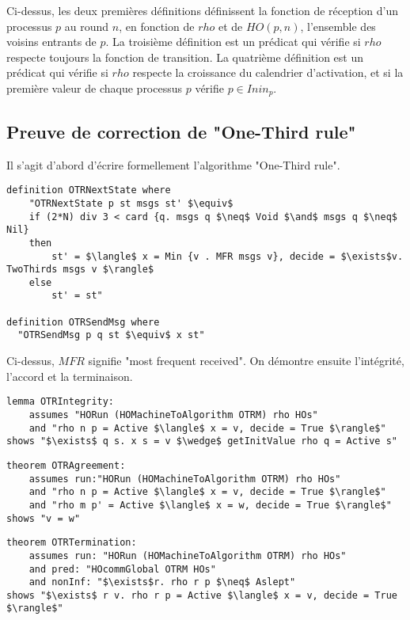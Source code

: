 \documentclass{article}
\begin{document}
Ci-dessus, les deux premières définitions définissent la fonction de réception d'un processus $p$ au round $n$, en fonction de $rho$ et de $HO(p, n)$, l'ensemble des voisins entrants de $p$.
La troisième définition est un prédicat qui vérifie si $rho$ respecte toujours la fonction de transition.
La quatrième définition est un prédicat qui vérifie si $rho$ respecte la croissance du calendrier d'activation, et si la première valeur de chaque processus $p$ vérifie $p \in Inin_p$.

\subsection{Preuve de correction de "One-Third rule"}

Il s'agit d'abord d'écrire formellement l'algorithme "One-Third rule".

\begin{lstlisting}[mathescape=true]
definition OTRNextState where
	"OTRNextState p st msgs st' $\equiv$ 
	if (2*N) div 3 < card {q. msgs q $\neq$ Void $\and$ msgs q $\neq$ Nil}
	then
		st' = $\langle$ x = Min {v . MFR msgs v}, decide = $\exists$v. TwoThirds msgs v $\rangle$
	else
		st' = st"

definition OTRSendMsg where
  "OTRSendMsg p q st $\equiv$ x st"
\end{lstlisting}

Ci-dessus, $MFR$ signifie "most frequent received".
On démontre ensuite l'intégrité, l'accord et la terminaison.

\begin{lstlisting}[mathescape=true]
lemma OTRIntegrity:
	assumes "HORun (HOMachineToAlgorithm OTRM) rho HOs" 
	and "rho n p = Active $\langle$ x = v, decide = True $\rangle$"
shows "$\exists$ q s. x s = v $\wedge$ getInitValue rho q = Active s"
\end{lstlisting}

\begin{lstlisting}[mathescape=true]
theorem OTRAgreement:
	assumes run:"HORun (HOMachineToAlgorithm OTRM) rho HOs"
	and "rho n p = Active $\langle$ x = v, decide = True $\rangle$"
	and "rho m p' = Active $\langle$ x = w, decide = True $\rangle$"
shows "v = w"
\end{lstlisting}

\begin{lstlisting}[mathescape=true]
theorem OTRTermination:
	assumes run: "HORun (HOMachineToAlgorithm OTRM) rho HOs" 
	and pred: "HOcommGlobal OTRM HOs"
	and nonInf: "$\exists$r. rho r p $\neq$ Aslept"
shows "$\exists$ r v. rho r p = Active $\langle$ x = v, decide = True $\rangle$"
\end{lstlisting}
\end{document}
